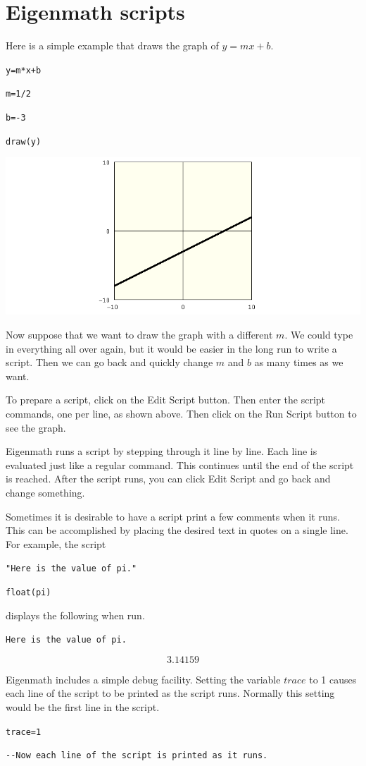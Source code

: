 \section*{Eigenmath scripts}
Here is a simple example that draws the graph of $y=mx+b$.

\medskip
\verb$y=m*x+b$

\verb$m=1/2$

\verb$b=-3$

\verb$draw(y)$

\begin{center}
\includegraphics[scale=0.4]{1.png}
\end{center}

\noindent
Now suppose that we want to draw the graph
with a different $m$.
We could type in everything all over again, but it would be easier
in the long run to write a script.
Then we can go back and quickly change $m$ and $b$ as many times as we want.

\medskip
\noindent
To prepare a script, click on the Edit Script button.
Then enter the script commands, one per line, as shown above.
Then click on the Run Script button to see the graph.

\medskip
\noindent
Eigenmath runs a script by stepping through it line by line.
Each line is evaluated just like a regular command.
This continues until the end of the script is reached.
After the script runs, you can click Edit Script and go back and change something.

\newpage

\noindent
Sometimes it is desirable to have a script print a few comments when it runs.
This can be accomplished by placing the desired text in quotes
on a single line.
For example, the script

\medskip
\verb$"Here is the value of pi."$

\verb$float(pi)$

\medskip
\noindent
displays the following when run.

\medskip
\verb$Here is the value of pi.$

$$3.14159$$

\medskip
\noindent
Eigenmath includes a simple debug facility.
Setting the variable $trace$ to 1 causes each line of the script to be
printed as the script runs.
Normally this setting would be the first line in the script.

\medskip
\verb$trace=1$

\verb$--Now each line of the script is printed as it runs.$

